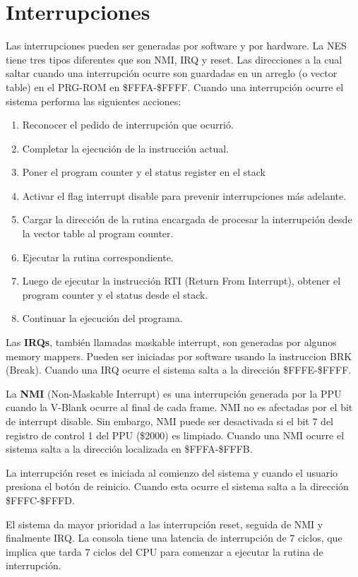 \section {Interrupciones}
Las interrupciones pueden ser generadas por software y por hardware. La NES tiene tres tipos diferentes que son NMI, IRQ y reset. Las direcciones a la cual saltar cuando una interrupción ocurre son guardadas en un arreglo (o vector table) en el PRG-ROM en \$FFFA-\$FFFF. Cuando una interrupción ocurre el sistema performa las siguientes acciones:
\begin{enumerate}
\item Reconocer el pedido de interrupción que ocurrió.
\item Completar la ejecución de la instrucción actual.
\item Poner el program counter y el status register en el stack
\item Activar el flag interrupt disable para prevenir interrupciones más adelante.
\item Cargar la dirección de la rutina encargada de procesar la interrupción desde la vector table al program counter.
\item Ejecutar la rutina correspondiente.
\item Luego de ejecutar la instrucción RTI (Return From Interrupt), obtener el program counter y el status desde el stack.
\item Continuar la ejecución del programa.
\end{enumerate}

Las \textbf{IRQs}, también llamadas maskable interrupt, son generadas por algunos memory mappers. Pueden ser iniciadas por software usando la instruccion BRK (Break). Cuando una IRQ ocurre el sistema salta a la dirección \$FFFE-\$FFFF.

La \textbf{NMI} (Non-Maskable Interrupt) es una interrupción generada por la PPU cuando la V-Blank ocurre al final de cada frame. NMI no es afectadas por el bit de interrupt disable. Sin embargo, NMI puede ser desactivada si el bit 7 del registro de control 1 del PPU (\$2000) es limpiado. Cuando una NMI ocurre el sistema salta a la dirección localizada en \$FFFA-\$FFFB.

La interrupción reset es iniciada al comienzo del sistema y cuando el usuario presiona el botón de reinicio. Cuando esta ocurre el sistema salta a la dirección \$FFFC-\$FFFD.

El sistema da mayor prioridad a las interrupción reset, seguida de NMI y finalmente IRQ.
La consola tiene una latencia de interrupción de 7 ciclos, que implica que tarda 7 ciclos del CPU para comenzar a ejecutar la rutina de interrupción.


